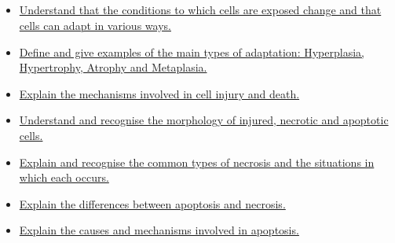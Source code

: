 \documentclass[10pt, a4paper]{article}
\begin{document}
\subsection{} \begin{itemize} \item \href{https://www.notion.so/4d662618de9045c0a0989d332b34d3a2}{Understand that the conditions to which cells are exposed change and that cells can adapt in various ways.} \item \href{https://www.notion.so/154dfd6470934c4bbab0e4eaea201a34}{Define and give examples of the main types of adaptation: Hyperplasia, Hypertrophy, Atrophy and Metaplasia.} \item \href{https://www.notion.so/a9a02843c0b54032b694038e16e90aaf}{Explain the mechanisms involved in cell injury and death.} \item \href{https://www.notion.so/4c56c546a37b48a297abbe00833f433c}{Understand and recognise the morphology of injured, necrotic and apoptotic cells.} \item \href{https://www.notion.so/0fa95f5d21034046a673540f9701f931}{Explain and recognise the common types of necrosis and the situations in which each occurs.} \item \href{https://www.notion.so/15f9d94368094a258a7e91b46e18a841}{Explain the differences between apoptosis and necrosis.} \item \href{https://www.notion.so/67da23fd9a4a45888fcedc836294788d}{Explain the causes and mechanisms involved in apoptosis.} \end{itemize}
\end{document}
